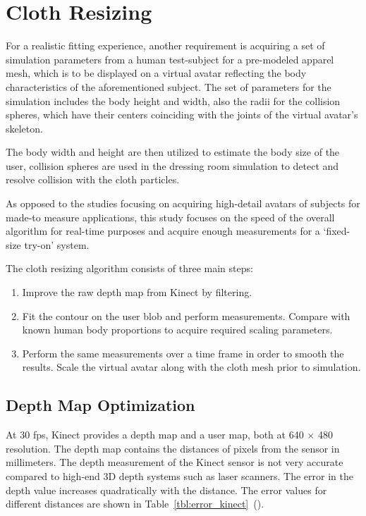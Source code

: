 \chapter{Cloth Resizing}
\label{chapter_cloth_resizing}
For a realistic fitting experience, another requirement is acquiring a set of simulation parameters from a human test-subject for a pre-modeled apparel mesh, which is to be displayed on a virtual avatar reflecting the body characteristics of the aforementioned subject.  The set of parameters for the simulation includes the body height and width, also the radii for the collision spheres, which have their centers coinciding with the joints of the virtual avatar's skeleton.
  
The body width and height are then utilized to estimate the body size of the user, collision spheres are used in the dressing room simulation to detect and resolve collision with the cloth particles.

As opposed to the studies focusing on acquiring high-detail avatars of subjects for made-to measure applications, this study focuses on the speed of the overall algorithm for real-time purposes and acquire enough measurements for a `fixed-size try-on' system.   

The cloth resizing algorithm consists of three main steps:
\begin{enumerate}
\item Improve the raw depth map from Kinect by filtering.
\item Fit the contour on the user blob and perform measurements. Compare with known human body proportions to acquire required scaling parameters.
\item Perform the same measurements over a time frame in order to smooth the results. Scale the virtual avatar along with the cloth mesh prior to simulation.
\end{enumerate}

\section{Depth Map Optimization}
\label{section_depth_map_optimization}
At 30 fps, Kinect provides a depth map and a user map, both at 640 $\times$ 480 resolution. The depth map contains the distances of pixels from the sensor in millimeters. The depth measurement of the Kinect sensor is not very accurate compared to high-end 3D depth systems such as laser scanners. The error in the depth value increases quadratically with the distance. The error values for different distances are shown in Table~\ref{tbl:error_kinect}~(\cite{Kourosh2012}).

